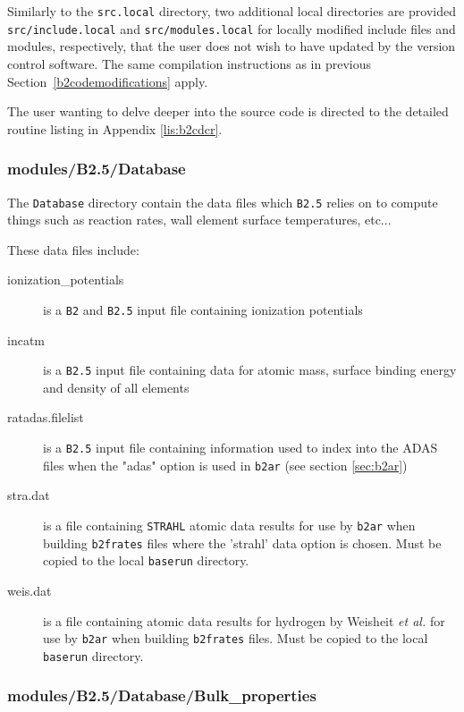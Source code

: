 \documentclass[a4paper,10pt]{report}
\begin{document}
Similarly to the {\tt src.local} directory, two additional local directories are provided
{\tt src/include.local} and {\tt src/modules.local} for locally modified include files
and modules, respectively, that the user does not wish to have updated by the version
control software. The same compilation instructions as in previous
Section~\ref{b2codemodifications} apply.

The user wanting to delve deeper into the source code is directed to the detailed routine
listing in Appendix \ref{lis:b2cdcr}.

\subsubsection{modules/B2.5/Database}

The {\tt Database} directory contain the data files which {\tt B2.5}
relies on to compute things such as reaction rates, wall element surface
temperatures, etc...

These data files include:
\begin{description}
\item[ionization\_potentials]  is a {\tt B2} and {\tt B2.5}
  input file containing ionization potentials
\item[incatm]  is a {\tt B2.5} input file containing data for
  atomic mass, surface binding energy and density of all elements
\item[ratadas.filelist]  is a {\tt B2.5} input file
  containing information used to index into the ADAS files when the
  "adas" option is used in {\tt b2ar} (see section \ref{sec:b2ar})
\item[stra.dat]  is a file containing {\tt STRAHL}
  atomic data results for use by {\tt b2ar} when building {\tt b2frates} files where the 'strahl' data
  option is chosen. Must be copied to the local {\tt baserun} directory.
\item[weis.dat]  is a file containing atomic data
  results for hydrogen by Weisheit {\it et al.} for use by {\tt b2ar} when building {\tt b2frates} files.
  Must be copied to the local {\tt baserun} directory.
\end{description}

\subsubsection{modules/B2.5/Database/Bulk\_properties}
\end{document}
